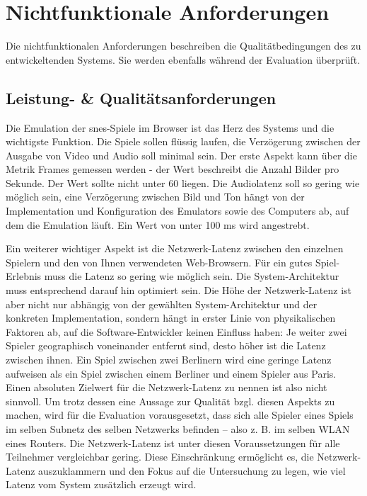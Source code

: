\section{Nichtfunktionale
Anforderungen}\label{nichtfunktionale-anforderungen}

Die nichtfunktionalen Anforderungen beschreiben die Qualitätbedingungen
des zu entwickeltenden Systems. Sie werden ebenfalls während der
Evaluation überprüft.

\subsection{Leistung- \&
Qualitätsanforderungen}\label{leistung--qualituxe4tsanforderungen}

Die Emulation der \gls{snes}-Spiele im Browser ist das Herz des Systems
und die wichtigste Funktion. Die Spiele sollen flüssig laufen, die
Verzögerung zwischen der Ausgabe von Video und Audio soll minimal sein.
Der erste Aspekt kann über die Metrik Frames gemessen werden - der Wert
beschreibt die Anzahl Bilder pro Sekunde. Der Wert sollte nicht unter 60
liegen. Die Audiolatenz soll so gering wie möglich sein, eine
Verzögerung zwischen Bild und Ton hängt von der Implementation und
Konfiguration des Emulators sowie des Computers ab, auf dem die
Emulation läuft. Ein Wert von unter 100 ms wird angestrebt.

Ein weiterer wichtiger Aspekt ist die Netzwerk-Latenz zwischen den
einzelnen Spielern und den von Ihnen verwendeten Web-Browsern. Für ein
gutes Spiel-Erlebnis muss die Latenz so gering wie möglich sein. Die
System-Architektur muss entsprechend darauf hin optimiert sein. Die Höhe
der Netzwerk-Latenz ist aber nicht nur abhängig von der gewählten
System-Architektur und der konkreten Implementation, sondern hängt in
erster Linie von physikalischen Faktoren ab, auf die Software-Entwickler
keinen Einfluss haben: Je weiter zwei Spieler geographisch voneinander
entfernt sind, desto höher ist die Latenz zwischen ihnen. Ein Spiel
zwischen zwei Berlinern wird eine geringe Latenz aufweisen als ein Spiel
zwischen einem Berliner und einem Spieler aus Paris. Einen absoluten
Zielwert für die Netzwerk-Latenz zu nennen ist also nicht sinnvoll. Um
trotz dessen eine Aussage zur Qualität bzgl. diesen Aspekts zu machen,
wird für die Evaluation vorausgesetzt, dass sich alle Spieler eines
Spiels im selben Subnetz des selben Netzwerks befinden -- also z. B. im
selben WLAN eines Routers. Die Netzwerk-Latenz ist unter diesen
Voraussetzungen für alle Teilnehmer vergleichbar gering. Diese
Einschränkung ermöglicht es, die Netzwerk-Latenz auszuklammern und den
Fokus auf die Untersuchung zu legen, wie viel Latenz vom System
zusätzlich erzeugt wird.

